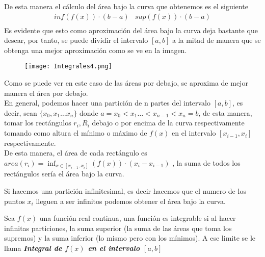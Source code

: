 \begin{figure}[H]
\centering
\graphicspath{{imagenes_analisis/}}

\end{figure}
\noindent
De esta manera el cálculo del área bajo la curva que obtenemos es el siguiente
\begin{equation*}
\begin{array}{rr}
 inf(f(x))\cdot (b-a)& sup(f(x))\cdot(b-a)\\
\end{array}
\end{equation*}
\noindent
Es evidente que esto como aproximación del área bajo la curva deja bastante que desear, por tanto, se puede dividir el intervalo $[a,b]$ a la mitad de manera que se obtenga una mejor aproximación como se ve en la imagen.
\begin{figure}[H]
\centering
\graphicspath{{imagenes_analisis/}}
\texttt{[image: Integrales4.png]}
\label{Función $f(x)$}

\end{figure}
\noindent
Como se puede ver en este caso de las áreas por debajo, se aproxima de mejor manera el área por debajo.\\
\noindent 
En general, podemos hacer una partición de n partes del intervalo $[a,b]$, es decir, sean $\lbrace x_0,x_1\ldots x_n\rbrace$ donde $a=x_0<x_1\ldots<x_{n-1}<x_n=b$, de esta manera, tomar los rectángulos $r_i, R_i$ debajo o por encima de la curva respectivamente tomando como altura el mínimo o máximo de $f(x)$ en el intervalo $[x_{i-1},x_{i}]$ respectivamente.\\
\noindent
De esta manera, el área de cada rectángulo es $\displaystyle area(r_i)=\inf_{x\in{[x_{i-1},x_i]}}(f(x))\cdot (x_{i}-x_{i-1})$ , la suma de todos los rectángulos sería el área bajo la curva. 

Si hacemos una partición infinitesimal, es decir hacemos que el numero de los puntos $x_i$ lleguen a ser infinitos podemos obtener el área bajo la curva. 

\begin{defi}
Sea $f(x)$ una función real continua, una función es integrable si al hacer infinitas particiones, la suma superior (la suma de las áreas que toma los supremos) y la suma inferior (lo mismo pero con los mínimos). A ese limite se le llama \textit{\textbf{Integral de $f(x)$ en el intervalo $[a,b]$}}
\end{defi}
\newpage
